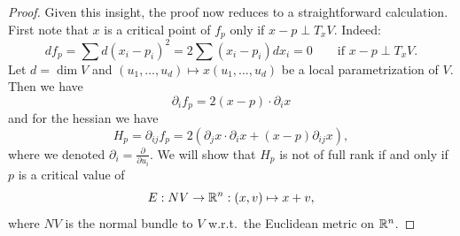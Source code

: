 \begin{proof}
    Given this insight, the proof now reduces to a straightforward calculation.
    First note that $x$ is a critical point of $f_p$ only if $x-p \perp T_x V$.
    Indeed:
    \[
        d f_p = \sum d(x_i - p_i)^2 = 2 \sum (x_i-p_i) dx_i = 0 \qquad \text{if $x-p \perp T_x V$}
    .\] 
    Let $d = \dim V$ and $(u_1, \ldots, u_d) \mapsto x(u_1, \ldots, u_d)$ be a local parametrization of $V$.
    Then we have
    \[
        \partial_i f_p = 2(x-p) \cdot  \partial_i  x
    \] 
    and for the hessian we have
    \[
    H_p = \partial_{ij} f_p = 2 \left(\partial_j x \cdot \partial_i x  + (x-p) \partial_{ij} x \right)
    ,\] 
    where we denoted $\partial_i = \frac{\partial }{\partial u_i}$.
    We will show that $H_p$ is not of full rank if and only if $p$ is a critical value of  
    \[
        E: NV \to  \mathbb{R}^n: (x, v) \mapsto x + v
    ,\] 
    where $NV$ is the normal bundle to $V$ w.r.t.\ the Euclidean metric on $\mathbb{R}^n$.


\end{proof}
